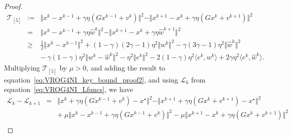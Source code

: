 \documentclass[10pt,a4paper]{amsart}
\def\eqref#1{equation~\ref{#1}}
\newcommand{\Lc}{\mathcal{L}}
\newcommand{\Tc}{\mathcal{T}}
\newcommand{\iprods}[1]{\langle #1\rangle}
\newcommand{\norms}[1]{\Vert#1\Vert}
\begin{document}
\begin{proof}
\begin{equation*} 
\begin{array}{lcl}
\Tc_{[5]} &:= & \norms{x^k - x^{k-1} + \gamma \eta(Gx^{k-1} + v^k) }^2 - \norms{x^{k+1} - x^k + \gamma \eta(Gx^{k} + v^{k+1}) }^2 \\
& = & \norms{x^k - x^{k-1} + \gamma \eta \hat{w}^k }^2 - \norms{x^{k+1} - x^k + \gamma \eta\hat{w}^{k+1} }^2 \\ 
& \geq & \frac{1}{2} \norms{x^k - x^{k-1}}^2 + (1-\gamma)(2\gamma-1)\eta^2 \norms{w^k}^2 - \gamma(3\gamma-1)\eta^2\norms{\hat{w}^k}^2 \\
&& - {~} \gamma(1-\gamma)\eta^2 \norms{w^k - \hat{w}^k}^2 - \eta^2\norms{e^k}^2 - 2(1-\gamma)\eta^2\iprods{e^k, w^k} + 2\gamma\eta^2\iprods{e^k, \hat{w}^k}.
\end{array} 
\end{equation*}
Multiplying $\Tc_{[5]}$ by $\mu > 0$, and adding the result to \eqref{eq:VROG4NI_key_bound_proof2}, and using $\Lc_k$ from \eqref{eq:VROG4NI_Lfuncs}, we have
\begin{equation*} 
\begin{array}{lcl}
\Lc_k - \Lc_{k+1} & = &  \norms{x^k + \gamma\eta(Gx^{k-1} + v^k) - x^{\star}}^2 - \norms{x^{k+1} + \gamma \eta(Gx^k + v^{k+1}) - x^{\star}}^2 \\
&& + {~} \mu \norms{x^k - x^{k-1} + \gamma \eta(Gx^{k-1} + v^k) }^2 - \mu \norms{x^{k+1} - x^k + \gamma \eta(Gx^k + v^{k+1}) }^2 \\

\end{array}
\end{equation*}
\end{proof}
\end{document}
